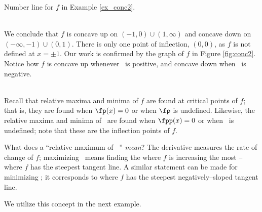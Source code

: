 {\noindent\begin{minipage}{\textwidth}\centering
{}
\captionsetup{type=figure}%
\caption{Number line for $f$ in Example \ref{ex_conc2}.}\label{fig:concline2}
\end{minipage}\\

We conclude that $f$ is concave up on $(-1,0)\cup(1,\infty)$ and concave down on $(-\infty,-1)\cup(0,1)$. There is only one point of inflection, $(0,0)$, as $f$ is not defined at $x=\pm 1$. Our work is confirmed by the graph of $f$ in Figure \ref{fig:conc2}. Notice how $f$ is concave up whenever \fpp\ is positive, and concave down when \fpp\ is negative.
}\\

Recall that relative maxima and minima of $f$ are found at critical points of $f$; that is, they are found when $\fp(x)=0$ or when $\fp$ is undefined. Likewise, the relative maxima and minima of \fp\ are found when $\fpp(x)=0$ or when \fpp\ is undefined; note that these are the inflection points of $f$. 

What does a ``relative maximum of \fp\ '' \textit{mean}? The derivative measures the rate of change of $f$; maximizing \fp\ means finding the where $f$ is increasing the most -- where $f$ has the steepest tangent line. A similar statement can be made for minimizing \fp; it corresponds to where $f$ has the steepest negatively--sloped tangent line.

We utilize this concept in the next example.\\

\enlargethispage{\baselineskip}

